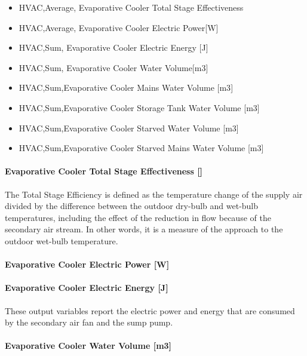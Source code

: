 \begin{itemize}
\item
  HVAC,Average, Evaporative Cooler Total Stage Effectiveness
\item
  HVAC,Average, Evaporative Cooler Electric Power{[}W{]}
\item
  HVAC,Sum, Evaporative Cooler Electric Energy {[}J{]}
\item
  HVAC,Sum, Evaporative Cooler Water Volume{[}m3{]}
\item
  HVAC,Sum,Evaporative Cooler Mains Water Volume {[}m3{]}
\item
  HVAC,Sum,Evaporative Cooler Storage Tank Water Volume {[}m3{]}
\item
  HVAC,Sum,Evaporative Cooler Starved Water Volume {[}m3{]}
\item
  HVAC,Sum,Evaporative Cooler Starved Mains Water Volume {[}m3{]}
\end{itemize}

\paragraph{Evaporative Cooler Total Stage Effectiveness {[]}}\label{evaporative-cooler-total-stage-effectiveness-1}

The Total Stage Efficiency is defined as the temperature change of the supply air divided by the difference between the outdoor dry-bulb and wet-bulb temperatures, including the effect of the reduction in flow because of the secondary air stream. In other words, it is a measure of the approach to the outdoor wet-bulb temperature.

\paragraph{Evaporative Cooler Electric Power {[}W{]}}\label{evaporative-cooler-electric-power-w}

\paragraph{Evaporative Cooler Electric Energy {[}J{]}}\label{evaporative-cooler-electric-energy-j-3}

These output variables report the electric power and energy that are consumed by the secondary air fan and the sump pump.

\paragraph{Evaporative Cooler Water Volume {[}m3{]}}\label{evaporative-cooler-water-volume-m3-2}

